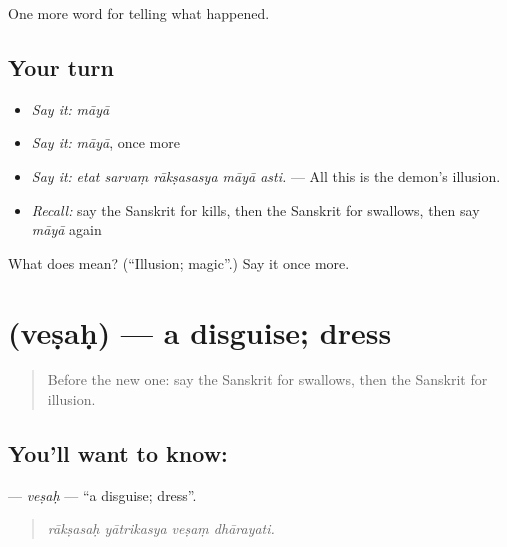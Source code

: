 \begin{grammarlens}[title={What you've built}]
One more word for telling what happened.
\end{grammarlens}

\subsection*{Your turn}
\begin{itemize}
\raggedright
  \item \emph{Say it:} \emph{māyā}
  \item \emph{Say it:} \emph{māyā}, once more
  \item \emph{Say it:} \emph{etat sarvaṃ rākṣasasya māyā asti.} — All this is the demon's illusion.
  \item \emph{Recall:} say the Sanskrit for kills, then the Sanskrit for swallows, then say \emph{māyā} again
\end{itemize}

\begin{tcolorbox}[breakable,colback=teal!4,colframe=teal!35!black,title={Before you move on}]
What does  mean? (\textquotedblleft{}Illusion; magic\textquotedblright{}.) Say it once more.
\end{tcolorbox}
\section[\texorpdfstring{\sk{वेषः} (veṣaḥ)}{वेषः (veṣaḥ)}]{ (veṣaḥ) — a disguise; dress}

\label{lesson:SA-C335-vesah}



\begin{quote}
Before the new one: say the Sanskrit for swallows, then the Sanskrit for illusion.
\end{quote}

\subsection*{You'll want to know: }
\textbf{} — \emph{veṣaḥ} — \textquotedblleft{}a disguise; dress\textquotedblright{}.

\begin{quote}
   
\end{quote}

\begin{quote}
\emph{rākṣasaḥ yātrikasya veṣaṃ dhārayati.}
\end{quote}

